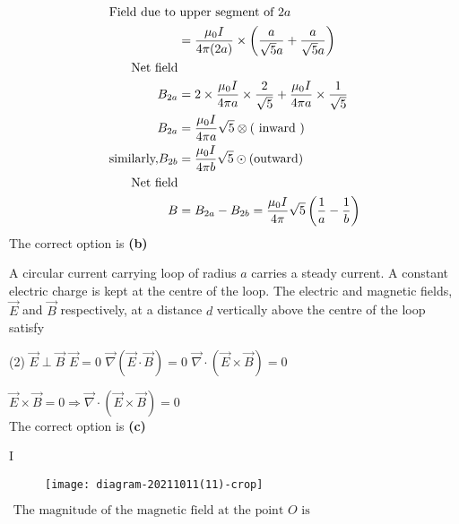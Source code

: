 \begin{enumerate}
\begin{answer}
\begin{align*}
	\intertext{Field due to upper segment of $2 a$}
	&=\frac{\mu_{0} I}{4 \pi(2 a)} \times\left(\frac{a}{\sqrt{5} a}+\frac{a}{\sqrt{5} a}\right)\\
	\text{Net field}\\
	B_{2 a}&=2 \times \frac{\mu_{0} I}{4 \pi a} \times \frac{2}{\sqrt{5}}+\frac{\mu_{0} I}{4 \pi a} \times \frac{1}{\sqrt{5}}\\
	B_{2 a}&=\frac{\mu_{0} I}{4 \pi a} \sqrt{5} \otimes(\text { inward })\\
	\text{similarly,} B_{2 b}&=\frac{\mu_{0} I}{4 \pi b} \sqrt{5} \odot \text{(outward)}\\
\text{	Net field}\\
 B&=B_{2 a}-B_{2 b}=\frac{\mu_{0} I}{4 \pi} \sqrt{5}\left(\frac{1}{a}-\frac{1}{b}\right)\\
	\end{align*}
	The correct option is \textbf{(b)}
\end{answer}
\begin{minipage}{\textwidth}
	\item A circular current carrying loop of radius $a$ carries a steady current. A constant electric charge is kept at the centre of the loop. The electric and magnetic fields, $\vec{E}$ and $\vec{B}$ respectively, at a distance $d$ vertically above the centre of the loop satisfy
\end{minipage}
\begin{tasks}(2)
	\task[\textbf{A.}] $\vec{E} \perp \vec{B}$
	\task[\textbf{B.}] $\vec{E}=0$
	\task[\textbf{C.}]$\vec{\nabla}(\vec{E} \cdot \vec{B})=0$
	\task[\textbf{D.}]$\vec{\nabla} \cdot(\vec{E} \times \vec{B})=0$
\end{tasks}
\begin{answer}
	$\vec{E} \times \vec{B}=0 \Rightarrow \vec{\nabla} \cdot(\vec{E} \times \vec{B})=0$\\
	The correct option is \textbf{(c)}
\end{answer}
\begin{minipage}{\textwidth}
	\item {} I \\
	\begin{figure}[H]
		\centering
		\texttt{[image: diagram-20211011(11)-crop]}
	\end{figure}
	$\text { The magnitude of the magnetic field at the point } O \text { is }$
\end{minipage}

\end{enumerate}
